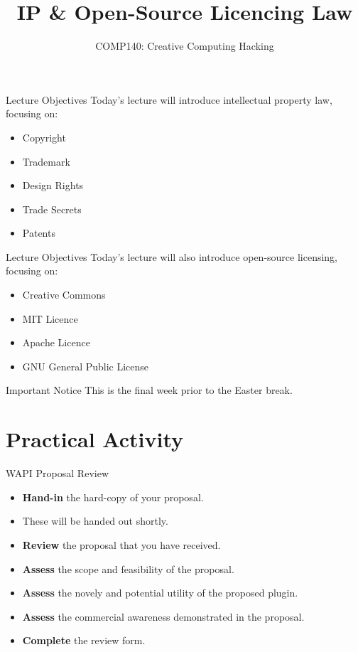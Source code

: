 \documentclass[xcolor={dvipsnames}]{beamer}\usepackage{etoolbox}\newtoggle{printable}\togglefalse{printable}
\begin{document}
\title{IP \& Open-Source Licencing Law}   
\subtitle{COMP140: Creative Computing Hacking}

\frame{\titlepage} 

\begin{frame}{Lecture Objectives}
	Today's lecture will introduce intellectual property law, focusing on:
	
	\begin{itemize}
		\item Copyright
		\item Trademark
		\item Design Rights
		\item Trade Secrets
		\item Patents
	\end{itemize}
\end{frame}

\begin{frame}{Lecture Objectives}
	Today's lecture will also introduce open-source licensing, focusing on:
	
	\begin{itemize}
		\item Creative Commons
		\item MIT Licence
		\item Apache Licence
		\item GNU General Public License
	\end{itemize}
\end{frame}

\begin{frame}{Important Notice}
	This is the final week prior to the Easter break.
\end{frame}



%

\part{Practical Activity}
\frame{\partpage}

\begin{frame}{WAPI Proposal Review}
	\begin{itemize}
		\item \textbf{Hand-in} the hard-copy of your proposal.
		\item These will be handed out shortly.
		\item \textbf{Review} the proposal that you have received.
		\item \textbf{Assess} the scope and feasibility of the proposal.
		\item \textbf{Assess} the novely and potential utility of the proposed plugin.
		\item \textbf{Assess} the commercial awareness demonstrated in the proposal.
		\item \textbf{Complete} the review form.
	\end{itemize}
\end{frame}
\end{document}
